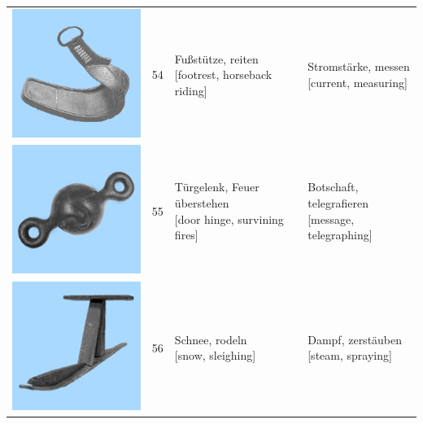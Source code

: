 \documentclass[
  english,
  man,floatsintext]{apa7}
\begin{document}
\begin{center}
\begin{ThreePartTable}
{\begin{longtable}{llll}
\includegraphics[valign=c, scale=0.23]{../materials/unfamiliar/54.png} & 54 & \makecell[l]{Fußstütze, reiten\\{[footrest, horseback riding]}} & \makecell[l]{Stromstärke, messen\\{[current, measuring]}}\\
\includegraphics[valign=c, scale=0.23]{../materials/unfamiliar/55.png} & 55 & \makecell[l]{Türgelenk, Feuer überstehen\\{[door hinge, survining fires]}} & \makecell[l]{Botschaft, telegrafieren\\{[message, telegraphing]}}\\
\includegraphics[valign=c, scale=0.23]{../materials/unfamiliar/56.png} & 56 & \makecell[l]{Schnee, rodeln\\{[snow, sleighing]}} & \makecell[l]{Dampf, zerstäuben\\{[steam, spraying]}}\\

\end{longtable}}
\end{ThreePartTable}
\end{center}
\end{document}
